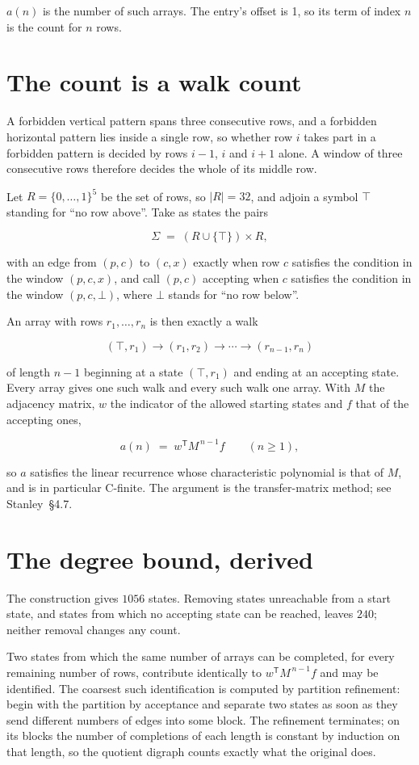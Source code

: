\documentclass[11pt]{article}
\theoremstyle{definition}
\begin{document}
$a(n)$ is the number of such arrays. The entry's offset is 1, so its term of index $n$ is the count for $n$ rows.

\section{The count is a walk count}

A forbidden vertical pattern spans three consecutive rows, and a forbidden horizontal pattern lies inside a single row, so whether row $i$ takes part in a forbidden pattern is decided by rows $i-1$, $i$ and $i+1$ alone. A window of three consecutive rows therefore decides the whole of its middle row.

Let $R = \{0,\dots,1\}^{5}$ be the set of rows, so $|R| = 32$, and adjoin a symbol $\top$ standing for ``no row above''. Take as states the pairs

\[\Sigma \;=\; (R \cup \{\top\}) \times R,\]

with an edge from $(p,c)$ to $(c,x)$ exactly when row $c$ satisfies the condition in the window $(p,c,x)$, and call $(p,c)$ accepting when $c$ satisfies the condition in the window $(p,c,\bot)$, where $\bot$ stands for ``no row below''.

An array with rows $r_1,\dots,r_n$ is then exactly a walk

\[(\top,r_1) \to (r_1,r_2) \to \cdots \to (r_{n-1},r_n)\]

of length $n-1$ beginning at a state $(\top,r_1)$ and ending at an accepting state. Every array gives one such walk and every such walk one array. With $M$ the adjacency matrix, $w$ the indicator of the allowed starting states and $f$ that of the accepting ones,

\[a(n) \;=\; w^{\mathsf T} M^{\,n-1} f \qquad (n \ge 1),\]

so $a$ satisfies the linear recurrence whose characteristic polynomial is that of $M$, and is in particular C-finite. The argument is the transfer-matrix method; see Stanley~\S4.7.

\section{The degree bound, derived}

The construction gives $1056$ states. Removing states unreachable from a start state, and states from which no accepting state can be reached, leaves $240$; neither removal changes any count.

Two states from which the same number of arrays can be completed, for every remaining number of rows, contribute identically to $w^{\mathsf T}M^{\,n-1}f$ and may be identified. The coarsest such identification is computed by partition refinement: begin with the partition by acceptance and separate two states as soon as they send different numbers of edges into some block. The refinement terminates; on its blocks the number of completions of each length is constant by induction on that length, so the quotient digraph counts exactly what the original does.
\end{document}
